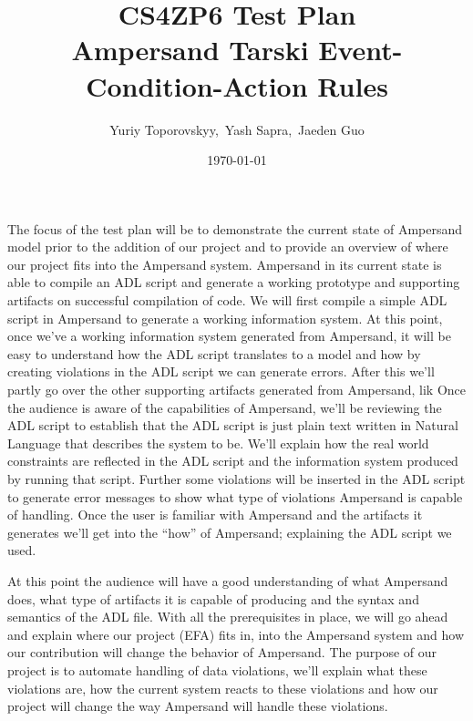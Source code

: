 \documentclass[12pt]{article}
\begin{document}
\title{CS4ZP6 Test Plan \\ Ampersand Tarski Event-Condition-Action 
Rules \\ \vspace{-1ex}} 
\author{\normalsize{Yuriy Toporovskyy,\ Yash Sapra,\ Jaeden Guo}}
\date{\normalsize\today \vspace{-3ex}}
\thispagestyle{empty}
\maketitle
\paragraph{}
The focus of the test plan will be to demonstrate the current state of 
Ampersand model prior to the addition of our project and to provide an overview 
of where our project fits into the Ampersand system. Ampersand in its current state is able 
to compile an ADL script and generate a working prototype and supporting artifacts on successful compilation of code.
\newline
\indent We will first compile a simple ADL script in Ampersand to generate a working
information system. At this point, once we've a working information system generated from Ampersand,
it will be easy to understand how the ADL script translates to a model and how by creating violations in the ADL script we can generate errors. After this we'll partly go over the other supporting artifacts generated from Ampersand, lik
Once the audience is aware of the capabilities of Ampersand, we'll be reviewing 
the ADL script to establish that the ADL script is just plain text written in Natural Language that
 describes the system to be.
 We'll explain how the real world constraints are reflected in the ADL script and the information system produced by running that script. Further some violations will be inserted in the ADL script to generate error messages to show what type of violations Ampersand is capable of handling. Once the user is familiar with Ampersand and the artifacts it generates we'll get into the ``how'' of  Ampersand; explaining the ADL script we used. 
 
 At this point the audience will have a good understanding of what Ampersand does, what type of artifacts it is capable of producing and the syntax and semantics of the ADL file. With all the prerequisites in place, we will go ahead and explain where our project (EFA) fits in, into the Ampersand system and how our contribution will change the behavior of Ampersand. The purpose of our project is to automate handling of data violations, we'll explain what these violations are, how the current system reacts to these violations and how our project will change the way Ampersand will handle these violations.
 
\end{document}

